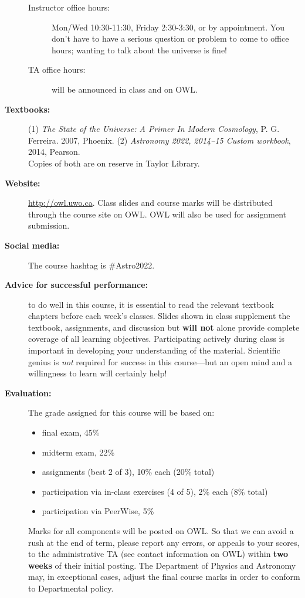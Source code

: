 \documentclass[12pt]{article}
\begin{document}
\begin{description}
\begin{description}
   \item[Instructor office hours:]
   {Mon/Wed 10:30-11:30, Friday 2:30-3:30, or by appointment. You don't have to have a serious question or problem to come to
   office hours; wanting to talk about the universe is fine!} 

  \item[TA office hours:] will be announced in class and on OWL.

   \end{description}

\item[\bf Textbooks:] (1) {\it The State of the Universe: A Primer In Modern Cosmology}, P. G. Ferreira. 2007, Phoenix.
(2) {\it Astronomy 2022, 2014--15 Custom workbook}, 2014, Pearson.\\
Copies of both are on reserve in Taylor Library. 

\item[\bf Website:] \url{http://owl.uwo.ca}. Class slides and course marks will be distributed through the course site
on OWL. OWL will also be used for assignment submission.

\item[\bf Social media:] The course hashtag is \#Astro2022.

\item[\bf Advice for successful performance:] to do well in this course, it is essential to read the relevant textbook chapters before
each week's classes. Slides shown in class supplement the textbook, assignments, and discussion but {\bf will not} alone provide
complete coverage of all learning objectives. Participating actively during class is important in developing
your understanding of the material. Scientific genius is {\it not} required for success in this course---but an open mind and a willingness
to learn will certainly help!

\newpage


\item[\bf Evaluation:] The grade assigned for this course will be based on: 
\begin{itemize}
\item final exam, 45\%
\item midterm exam, 22\% 
\item assignments (best 2 of 3), 10\% each (20\% total)
\item participation via in-class exercises (4 of 5), 2\% each (8\% total)
\item participation via PeerWise, 5\%
\end{itemize}
Marks for all components will be posted on OWL. So that we can avoid a rush at the end of term, please report any errors, or appeals to your scores, to 
the administrative TA (see contact information on OWL) within {\bf two weeks} of their initial posting.
The Department of Physics and Astronomy may, in exceptional cases, adjust the final course marks in order to conform to Departmental policy.


\end{description}
\end{document}
